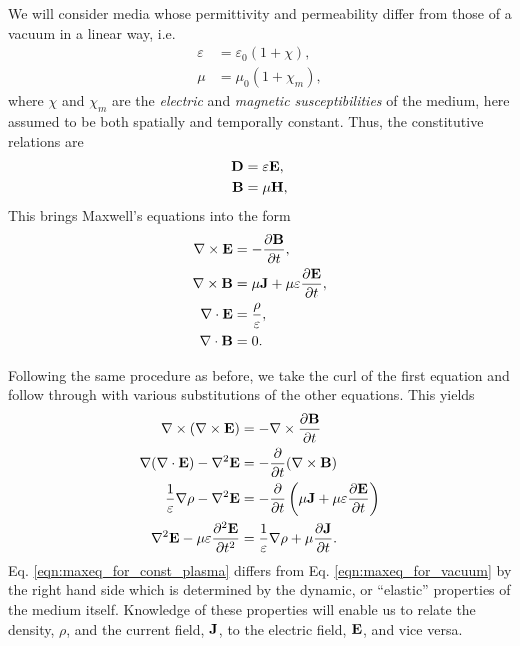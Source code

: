 \documentclass{book}
\newcommand{\pd}[2]{\frac{\partial {#1}}{\partial {#2}}}
\newcommand{\ppd}[2]{\frac{\partial^2{#1}}{\partial {#2}^2}}
\begin{document}
We will consider media whose permittivity and permeability differ from those of a vacuum in a linear way, i.e.
\begin{align}
    \varepsilon &= \varepsilon_0(1 + \chi), \\
    \mu &= \mu_0(1 + \chi_m),
\end{align}
where $\chi$ and $\chi_m$ are the \textit{electric} and \textit{magnetic susceptibilities} of the medium, here assumed to be both spatially and temporally constant.
Thus, the constitutive relations are
\begin{equation}
    \begin{aligned}
        {\bf D} &= \varepsilon {\bf E}, \\
        {\bf B} &= \mu {\bf H},
    \end{aligned}
\end{equation}
This brings Maxwell's equations into the form
\begin{equation}
    \begin{aligned}
        \nabla \times {\bf E} &= -\pd{\bf B}{t}, \\
        \nabla \times {\bf B} &= \mu {\bf J} + \mu \varepsilon \pd{\bf E}{t}, \\
        \nabla \cdot {\bf E} &= \frac{\rho}{\varepsilon}, \\
        \nabla \cdot {\bf B} &= 0.
    \end{aligned}
\end{equation}

Following the same procedure as before, we take the curl of the first equation and follow through with various substitutions of the other equations.
This yields
\begin{equation}
    \begin{aligned}
        \nabla \times (\nabla \times {\bf E})
            &= -\nabla \times \pd{\bf B}{t} \\
        \nabla (\nabla \cdot {\bf E}) - \nabla^2{\bf E}
            &= -\pd{}{t} (\nabla \times {\bf B}) \\
        \frac{1}{\varepsilon} \nabla \rho - \nabla^2 {\bf E}
            &= -\pd{}{t} \left( \mu {\bf J} + \mu \varepsilon \pd{\bf E}{t} \right) \\
        \nabla^2 {\bf E} - \mu \varepsilon \ppd{\bf E}{t}
            &= \frac{1}{\varepsilon} \nabla \rho + \mu \pd{\bf J}{t}.
    \end{aligned}
    \label{eqn:maxeq_for_const_plasma}
\end{equation}
Eq. \eqref{eqn:maxeq_for_const_plasma} differs from Eq. \eqref{eqn:maxeq_for_vacuum} by the right hand side which is determined by the dynamic, or ``elastic'' properties of the medium itself.
Knowledge of these properties will enable us to relate the density, $\rho$, and the current field, ${\bf J}$, to the electric field, ${\bf E}$, and vice versa.
\end{document}
